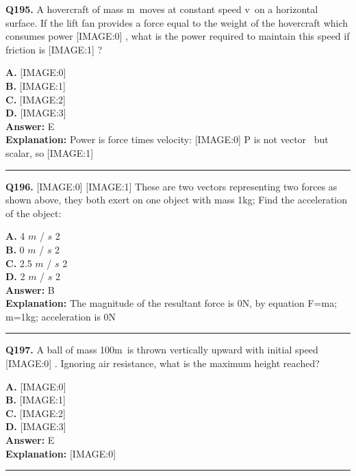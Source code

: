 \documentclass[12pt]{article}
\begin{document}
\noindent
\textbf{Q195.} A hovercraft of mass m moves at constant speed v on a horizontal surface. If the lift fan provides a force equal to the weight of the hovercraft which consumes power
[IMAGE:0]
, what is the power required to maintain this speed if friction is
[IMAGE:1]
?



\textbf{A.} [IMAGE:0] \\
\textbf{B.} [IMAGE:1] \\
\textbf{C.} [IMAGE:2] \\
\textbf{D.} [IMAGE:3] \\

\textbf{Answer:} E \\
\textbf{Explanation:} Power is force times velocity:
[IMAGE:0]
P is not vector  but scalar, so
[IMAGE:1]

\hrule
\vspace{1em}


\noindent
\textbf{Q196.} [IMAGE:0]
[IMAGE:1]
These are two vectors representing two forces as shown above, they both exert on one object with mass 1kg; Find the acceleration of the object:



\textbf{A.} 4
$𝑚$
/
$𝑠$
2 \\
\textbf{B.} 0
$𝑚$
/
$𝑠$
2 \\
\textbf{C.} 2.5
$𝑚$
/
$𝑠$
2 \\
\textbf{D.} 2
$𝑚$
/
$𝑠$
2 \\

\textbf{Answer:} B \\
\textbf{Explanation:} The magnitude of the resultant force is 0N, by equation F=ma; m=1kg; acceleration is 0N

\hrule
\vspace{1em}


\noindent
\textbf{Q197.} A ball of mass 100m is thrown vertically upward with initial speed
[IMAGE:0]
. Ignoring air resistance, what is the maximum height reached?



\textbf{A.} [IMAGE:0] \\
\textbf{B.} [IMAGE:1] \\
\textbf{C.} [IMAGE:2] \\
\textbf{D.} [IMAGE:3] \\

\textbf{Answer:} E \\
\textbf{Explanation:} [IMAGE:0]

\hrule
\vspace{1em}
\end{document}
